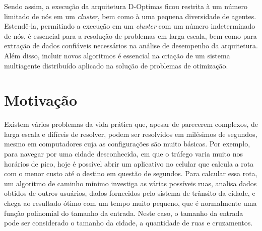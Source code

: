 
Sendo assim, a execução da arquitetura D-Optimas ficou restrita à um número limitado de nós em um \textit{cluster}, bem como à uma pequena diversidade de agentes. Estendê-la, permitindo a execução em um \textit{cluster} com um número indeterminado de nós, é essencial para a resolução de problemas em larga escala, bem como para extração de dados confiáveis necessários na análise de desempenho da arquitetura. Além disso, incluir novos algoritmos é essencial na criação de um sistema multiagente distribuído aplicado na solução de problemas de otimização. 

\section{Motivação}

Existem vários problemas da vida prática que, apesar de parecerem complexos, de larga escala e difíceis de resolver, podem ser resolvidos em milésimos de segundos, mesmo em computadores cuja as configurações são muito básicas. Por exemplo, para navegar por uma cidade desconhecida, em que o tráfego varia muito nos horários de pico, hoje é possível abrir um aplicativo no celular que calcula a rota com o menor custo até o destino em questão de segundos. Para calcular essa rota, um algoritmo de caminho mínimo \cite{xu2007} investiga as várias possíveis ruas, analisa dados obtidos de outros usuários, dados fornecidos pelo sistema de trânsito da cidade, e chega ao resultado ótimo com um tempo muito pequeno, que é normalmente uma função polinomial do tamanho da entrada. Neste caso, o tamanho da entrada pode ser considerado o tamanho da cidade, a quantidade de ruas e cruzamentos. 

